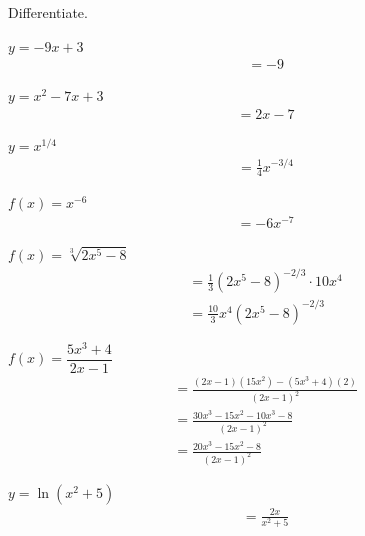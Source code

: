 \documentclass[12pt]{article}
\newenvironment{problem}[2][]{
    \begin{trivlist}
        \item[
            {\bfseries #1}
            {\bfseries #2.}
        ]
}{\end{trivlist}}
\newcommand{\Problem}[1]{\bigskip \noindent #1}
\begin{document}
\Problem{Differentiate.}

\begin{problem}{10}
    $y = -9x + 3$
    \begin{align}
        &= -9
    \end{align}
\end{problem}

\begin{problem}{11}
    $y = x^2 - 7x + 3$
    \begin{align}
        &= 2x - 7
    \end{align}
\end{problem}

\begin{problem}{12}
    $y = x^{1/4}$
    \begin{align}
        &= \frac{1}{4} x^{-3/4}
    \end{align}
\end{problem}

\begin{problem}{13}
    $f(x) = x^{-6}$
    \begin{align}
        &= -6x^{-7}
    \end{align}
\end{problem}

\begin{problem}{14}
    $f(x) = \sqrt[3]{2x^5 - 8}$
    \begin{align}
        &= \frac{1}{3} \left(2x^5 - 8\right)^{-2/3} \cdot 10x^4 \\
        &= \frac{10}{3} x^4 \left(2x^5 - 8\right)^{-2/3}
    \end{align}
\end{problem}

\begin{problem}{15}
    $f(x) = \dfrac{5x^3 + 4}{2x - 1}$
    \begin{align}
        &= \frac{\left(2x - 1\right) \left(15x^2\right) - \left(5x^3 + 4\right) \left(2\right)}{\left(2x - 1\right)^2} \\
        &= \frac{30x^3 - 15x^2 - 10x^3 - 8}{\left(2x - 1\right)^2} \\
        &= \frac{20x^3 - 15x^2 - 8}{\left(2x - 1\right)^2}
    \end{align}
\end{problem}

\begin{problem}{16}
    $y = \ln \left(x^2 + 5\right)$
    \begin{align}
        &= \frac{2x}{x^2 + 5}
    \end{align}
\end{problem}
\end{document}
